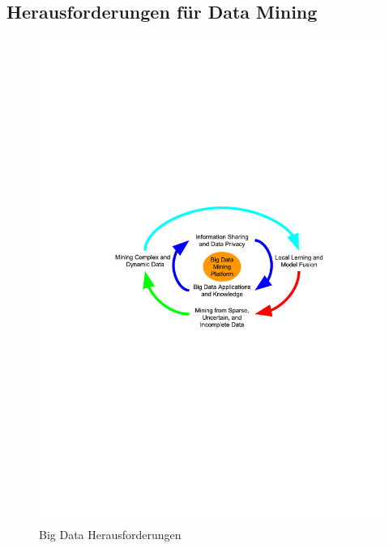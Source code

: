 \documentclass[12pt,journal,compsoc,ngerman]{IEEEtran}
\begin{document}
\subsection{Herausforderungen für Data Mining}
\begin{figure}[!t]
\centering
\label{fig:bigdata}
\includegraphics[scale=0.65,trim={120 340 100 280},clip]{../beamer/img/bigdata42.pdf}
\caption{Big Data Herausforderungen \cite{wu2014data}}
\end{figure}
\end{document}

